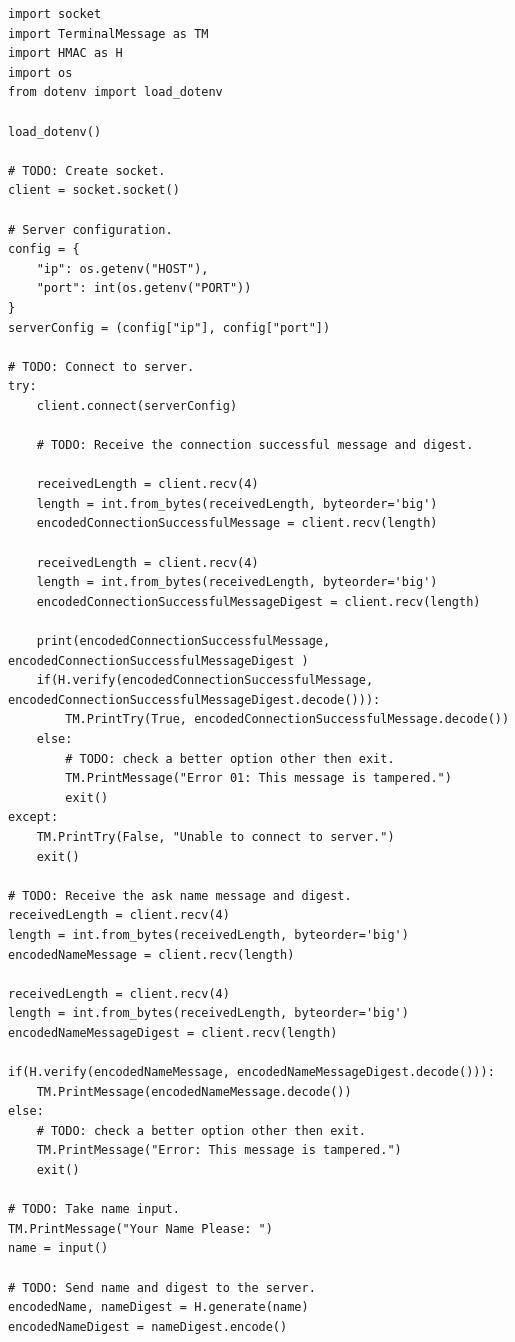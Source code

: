 \begin{lstlisting}[style=mypython, caption={client.py}, label={code:A-2-a-client}]
import socket
import TerminalMessage as TM
import HMAC as H
import os
from dotenv import load_dotenv

load_dotenv()

# TODO: Create socket.
client = socket.socket()

# Server configuration.
config = {
    "ip": os.getenv("HOST"),
    "port": int(os.getenv("PORT"))
}
serverConfig = (config["ip"], config["port"])

# TODO: Connect to server.
try:
    client.connect(serverConfig)

    # TODO: Receive the connection successful message and digest.

    receivedLength = client.recv(4)
    length = int.from_bytes(receivedLength, byteorder='big')
    encodedConnectionSuccessfulMessage = client.recv(length)

    receivedLength = client.recv(4)
    length = int.from_bytes(receivedLength, byteorder='big')
    encodedConnectionSuccessfulMessageDigest = client.recv(length)

    print(encodedConnectionSuccessfulMessage, encodedConnectionSuccessfulMessageDigest )
    if(H.verify(encodedConnectionSuccessfulMessage, encodedConnectionSuccessfulMessageDigest.decode())):
        TM.PrintTry(True, encodedConnectionSuccessfulMessage.decode())
    else:
        # TODO: check a better option other then exit.
        TM.PrintMessage("Error 01: This message is tampered.")
        exit()
except:
    TM.PrintTry(False, "Unable to connect to server.")
    exit()

# TODO: Receive the ask name message and digest.
receivedLength = client.recv(4)
length = int.from_bytes(receivedLength, byteorder='big')
encodedNameMessage = client.recv(length)

receivedLength = client.recv(4)
length = int.from_bytes(receivedLength, byteorder='big')
encodedNameMessageDigest = client.recv(length)

if(H.verify(encodedNameMessage, encodedNameMessageDigest.decode())):
    TM.PrintMessage(encodedNameMessage.decode())
else:
    # TODO: check a better option other then exit.
    TM.PrintMessage("Error: This message is tampered.")
    exit()

# TODO: Take name input.
TM.PrintMessage("Your Name Please: ")
name = input()

# TODO: Send name and digest to the server.
encodedName, nameDigest = H.generate(name)
encodedNameDigest = nameDigest.encode()


\end{lstlisting}
